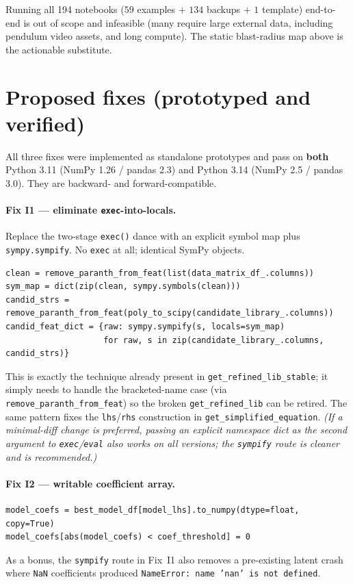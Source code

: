 \documentclass[11pt]{article}
\newcommand{\code}[1]{\texttt{\small #1}}
\begin{document}
\noindent Running all 194 notebooks ($59$ examples $+$ $134$ backups $+$ $1$
template) end-to-end is out of scope and infeasible (many require large external
data, including pendulum video assets, and long compute). The static blast-radius
map above is the actionable substitute.

\section{Proposed fixes (prototyped and verified)}
\label{sec:fixes}

All three fixes were implemented as standalone prototypes and pass on
\textbf{both} Python 3.11 (NumPy 1.26 / pandas 2.3) and Python 3.14
(NumPy 2.5 / pandas 3.0). They are backward- and forward-compatible.

\paragraph{Fix I1 --- eliminate \code{exec}-into-locals.}
Replace the two-stage \code{exec()} dance with an explicit symbol map plus
\code{sympy.sympify}. No \code{exec} at all; identical SymPy objects.
\begin{lstlisting}
clean = remove_paranth_from_feat(list(data_matrix_df_.columns))
sym_map = dict(zip(clean, sympy.symbols(clean)))
candid_strs = remove_paranth_from_feat(poly_to_scipy(candidate_library_.columns))
candid_feat_dict = {raw: sympy.sympify(s, locals=sym_map)
                    for raw, s in zip(candidate_library_.columns, candid_strs)}
\end{lstlisting}
This is exactly the technique already present in \code{get\_refined\_lib\_stable};
it simply needs to handle the bracketed-name case (via \code{remove\_paranth\_from\_feat})
so the broken \code{get\_refined\_lib} can be retired. The same pattern fixes the
\code{lhs}/\code{rhs} construction in \code{get\_simplified\_equation}.
\emph{(If a minimal-diff change is preferred, passing an explicit namespace dict as
the second argument to \code{exec}/\code{eval} also works on all versions; the
\code{sympify} route is cleaner and is recommended.)}

\paragraph{Fix I2 --- writable coefficient array.}
\begin{lstlisting}
model_coefs = best_model_df[model_lhs].to_numpy(dtype=float, copy=True)
model_coefs[abs(model_coefs) < coef_threshold] = 0
\end{lstlisting}
As a bonus, the \code{sympify} route in Fix~I1 also removes a pre-existing latent
crash where \code{NaN} coefficients produced \code{NameError: name 'nan' is not defined}.
\end{document}
